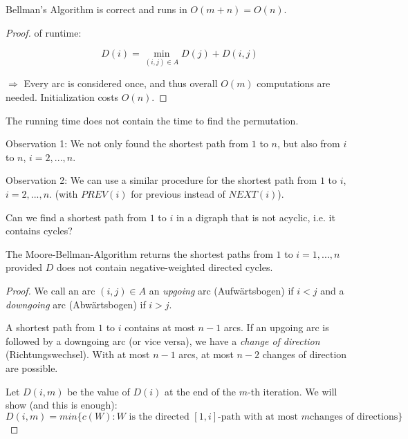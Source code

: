 \begin{lec}[2011-10-20]\end{lec}

\begin{thm} %
Bellman's Algorithm is correct and runs in $O(m + n) = O(n)$.
\end{thm}
\begin{proof}
of runtime:

\[ D(i) = \min\limits_{(i,j) \in A} D(j) + D(i, j) \]

$\Rightarrow$ Every arc is considered once, and thus overall $O(m)$
computations are needed. Initialization costs $O(n)$.
\end{proof}

\begin{bem+}
The running time does not contain the time to find the permutation.
\end{bem+}

Observation 1: We not only found the shortest path from $1$ to $n$, but
also from $i$ to $n$, $i = 2, ..., n$.

Observation 2: We can use a similar procedure for the shortest path from
$1$ to $i$, $i = 2, ..., n$. (with $PREV(i)$ for previous instead of
$NEXT(i)$).

\begin{qstn}
Can we find a shortest path from $1$ to $i$ in a digraph that is
not acyclic, i.e. it contains cycles?
\end{qstn}

\begin{thm} %
The Moore-Bellman-Algorithm returns the shortest paths from $1$ to $i = 1,
..., n$ provided $D$ does not contain negative-weighted directed cycles.
\end{thm}
\begin{proof}
We call an arc $(i, j) \in A$ an \emph{upgoing} arc (Aufwärtsbogen) if $i < j$ and a
\emph{downgoing} arc (Abwärtsbogen) if $i > j$.

A shortest path from $1$ to $i$ contains at most $n-1$ arcs. If an upgoing
arc is followed by a downgoing arc (or vice versa), we have a \emph{change
of direction} (Richtungswechsel). With at most $n-1$ arcs, at most $n-2$
changes of direction are possible.

Let $D(i, m)$ be the value of $D(i)$ at the end of the $m$-th iteration.
We will show (and this is enough):
\[ D(i, m) = min \{ c(W): \textrm{$W$ is the directed $[1,i]$-path with at most $m$
changes of directions} \} \]
\end{proof}
